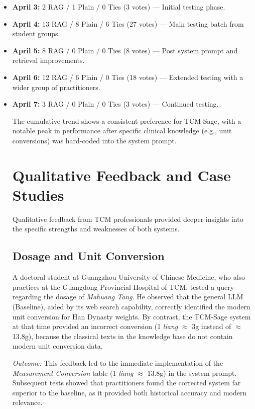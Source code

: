 \begin{itemize}
    \item \textbf{April 3:} 2 RAG / 1 Plain / 0 Ties (3 votes) --- Initial testing phase.
    \item \textbf{April 4:} 13 RAG / 8 Plain / 6 Ties (27 votes) --- Main testing batch from student groups.
    \item \textbf{April 5:} 8 RAG / 0 Plain / 0 Ties (8 votes) --- Post system prompt and retrieval improvements.
    \item \textbf{April 6:} 12 RAG / 6 Plain / 0 Ties (18 votes) --- Extended testing with a wider group of practitioners.
    \item \textbf{April 7:} 3 RAG / 0 Plain / 0 Ties (3 votes) --- Continued testing.

The cumulative trend shows a consistent preference for TCM-Sage, with a notable peak in performance after specific clinical knowledge (e.g., unit conversions) was hard-coded into the system prompt.

\section{Qualitative Feedback and Case Studies}

Qualitative feedback from TCM professionals provided deeper insights into the specific strengths and weaknesses of both systems.

\subsection{Dosage and Unit Conversion}
A doctoral student at Guangzhou University of Chinese Medicine, who also practices at the Guangdong Provincial Hospital of TCM, tested a query regarding the dosage of \textit{Mahuang Tang}. He observed that the general LLM (Baseline), aided by its web search capability, correctly identified the modern unit conversion for Han Dynasty weights. By contrast, the TCM-Sage system at that time provided an incorrect conversion (1 \textit{liang} $\approx$ 3g instead of $\approx$ 13.8g), because the classical texts in the knowledge base do not contain modern unit conversion data.

\textit{Outcome:} This feedback led to the immediate implementation of the \textit{Measurement Conversion} table (1 \textit{liang} $\approx$ 13.8g) in the system prompt. Subsequent tests showed that practitioners found the corrected system far superior to the baseline, as it provided both historical accuracy and modern relevance.


\end{itemize}
